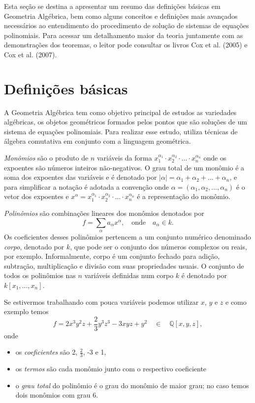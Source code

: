 \documentclass[a4paper,12pt,oneside,onecolumn,final,fleqn]{repUERJ}
\begin{document}
Esta seção se destina a apresentar um resumo das definições básicas em Geometria Algébrica, bem como alguns conceitos e definições mais avançados necessários ao entendimento do procedimento de solução de sistemas de equações polinomiais. Para acessar um detalhamento maior da teoria juntamente com as demonstrações dos teoremas, o leitor pode consultar os livros Cox et al. (2005) e Cox et al. (2007).

\section{Definições básicas}

A Geometria Algébrica tem como objetivo principal de estudos as variedades algébricas, os objetos geométricos
formados pelos pontos que são soluções de um sistema de equações polinomiais. Para realizar esse estudo, utiliza técnicas de álgebra comutativa em conjunto com a linguagem geométrica.

{\it Monômios} são o produto de $n$ variáveis da forma $x_1^{\alpha_1}\cdot x_2^{\alpha_2} \cdot ... \cdot x_n^{\alpha_n}$ onde os expoentes são números inteiros não-negativos. O grau total de um monômio é a soma dos expoentes das variáveis e é denotado por $|\alpha|=\alpha_1+\alpha_2+...+\alpha_n$, e para simplificar a notação é adotada a convenção onde $\alpha=(\alpha_1,\alpha_2,...,\alpha_n)$ é o vetor dos expoentes e $x^\alpha=x_1^{\alpha_1}\cdot x_2^{\alpha_2} \cdot ... \cdot x_n^{\alpha_n}$ é a representação do monômio.

{\it Polinômios} são combinações lineares dos monômios denotados por
\begin{equation*}
f=\sum_\alpha a_\alpha x^\alpha,\quad\text{onde}\quad a_\alpha\in k.
\end{equation*} 
Os coeficientes desses polinômios pertencem a um conjunto numérico denominado {\it corpo}, denotado por $k$, que pode ser o conjunto dos números complexos ou reais, por exemplo. Informalmente, corpo é um conjunto fechado para adição, subtração, multiplicação e divisão com suas propriedades usuais. O conjunto de todos os polinômios nas $n$ variáveis definidas num corpo $k$ é denotado por $k[x_1,...,x_n]$.

Se estivermos trabalhando com pouca variáveis podemos utilizar $x$, $y$ e $z$ e como exemplo temos
\begin{equation*}
f=2x^3y^2z+\frac{2}{3}y^3z^3-3xyz+y^2\quad\in\quad\mathbb{Q}[x,y,z],
\end{equation*} 
onde
\begin{itemize}
\item os {\it coeficientes} são 2, $\frac{2}{3}$, -3 e 1,
\item os {\it termos} são cada monômio junto com o respectivo coeficiente
\item o {\it grau total} do polinômio é o grau do monômio de maior grau; no caso temos dois monômios com grau 6.
\end{itemize}
\end{document}
